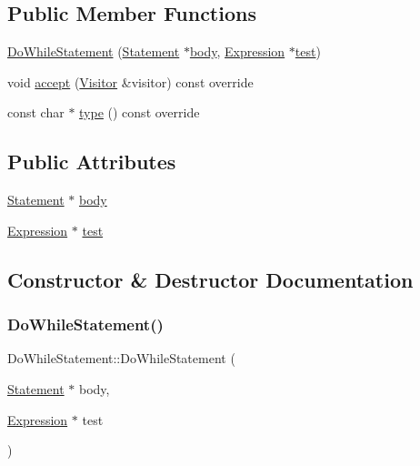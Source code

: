 \subsection*{Public Member Functions}
\begin{DoxyCompactItemize}
\item 
\hyperlink{struct_do_while_statement_a26ed6b1502f71b59ac3cdfcfa3b7d07a}{Do\+While\+Statement} (\hyperlink{struct_statement}{Statement} $\ast$\hyperlink{struct_do_while_statement_a1742b816c78d6cfd511e69317461b52a}{body}, \hyperlink{struct_expression}{Expression} $\ast$\hyperlink{struct_do_while_statement_acd80c72a8d08b897462572fcce19fa42}{test})
\item 
void \hyperlink{struct_do_while_statement_afa4ddac75d1899fa41a134a49aa9c48f}{accept} (\hyperlink{struct_visitor}{Visitor} \&visitor) const override
\item 
const char $\ast$ \hyperlink{struct_do_while_statement_a91437b71a28b99c4cef7086dd89033ac}{type} () const override
\end{DoxyCompactItemize}
\subsection*{Public Attributes}
\begin{DoxyCompactItemize}
\item 
\hyperlink{struct_statement}{Statement} $\ast$ \hyperlink{struct_do_while_statement_a1742b816c78d6cfd511e69317461b52a}{body}
\item 
\hyperlink{struct_expression}{Expression} $\ast$ \hyperlink{struct_do_while_statement_acd80c72a8d08b897462572fcce19fa42}{test}
\end{DoxyCompactItemize}


\subsection{Constructor \& Destructor Documentation}
\mbox{\label{struct_do_while_statement_a26ed6b1502f71b59ac3cdfcfa3b7d07a}} 
\subsubsection{\texorpdfstring{Do\+While\+Statement()}{DoWhileStatement()}}
{\footnotesize\ttfamily Do\+While\+Statement\+::\+Do\+While\+Statement (\begin{DoxyParamCaption}\item[{\hyperlink{struct_statement}{Statement} $\ast$}]{body,  }\item[{\hyperlink{struct_expression}{Expression} $\ast$}]{test }\end{DoxyParamCaption})\hspace{0.3cm}{\ttfamily [inline]}}



